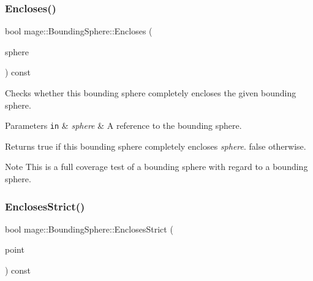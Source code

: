 \subsubsection{\texorpdfstring{Encloses()}{Encloses()}\hspace{0.1cm}{\footnotesize\ttfamily [4/4]}}
{\footnotesize\ttfamily bool mage\+::\+Bounding\+Sphere\+::\+Encloses (\begin{DoxyParamCaption}\item[{const \mbox{\hyperlink{classmage_1_1_bounding_sphere}{Bounding\+Sphere}} \&}]{sphere }\end{DoxyParamCaption}) const\hspace{0.3cm}{\ttfamily [noexcept]}}

Checks whether this bounding sphere completely encloses the given bounding sphere.


\begin{DoxyParams}[1]{Parameters}
\mbox{\tt in}  & {\em sphere} & A reference to the bounding sphere. \\
\hline
\end{DoxyParams}
\begin{DoxyReturn}{Returns}
{\ttfamily true} if this bounding sphere completely encloses {\itshape sphere}. {\ttfamily false} otherwise. 
\end{DoxyReturn}
\begin{DoxyNote}{Note}
This is a full coverage test of a bounding sphere with regard to a bounding sphere. 
\end{DoxyNote}
\mbox{\label{classmage_1_1_bounding_sphere_a749a8fa3317e5490c12b049e68f7d502}} 
\subsubsection{\texorpdfstring{Encloses\+Strict()}{EnclosesStrict()}\hspace{0.1cm}{\footnotesize\ttfamily [1/4]}}
{\footnotesize\ttfamily bool mage\+::\+Bounding\+Sphere\+::\+Encloses\+Strict (\begin{DoxyParamCaption}\item[{const \mbox{\hyperlink{structmage_1_1_point3}{Point3}} \&}]{point }\end{DoxyParamCaption}) const\hspace{0.3cm}{\ttfamily [noexcept]}}

